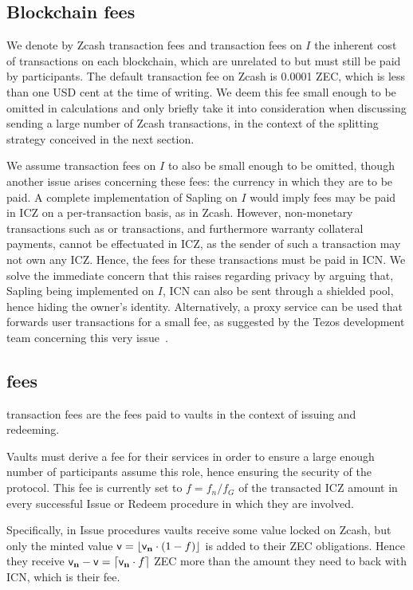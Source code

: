 \subsection{Blockchain fees}

We denote by Zcash transaction fees and transaction fees on $I$ the inherent cost of transactions on each blockchain, which are unrelated to \zclaim but must still be paid by participants.
The default transaction fee on Zcash is 0.0001 ZEC, which is less than one USD cent at the time of writing.
We deem this fee small enough to be omitted in calculations and only briefly take it into consideration when discussing sending a large number of Zcash transactions, in the context of the splitting strategy conceived in the next section.

We assume transaction fees on $I$ to also be small enough to be omitted, though another issue arises concerning these fees: the currency in which they are to be paid.
A complete implementation of Sapling on $I$ would imply fees may be paid in ICZ on a per-transaction basis, as in Zcash.
However, non-monetary \zclaim transactions such as \requestLock or \confirmIssue transactions, and furthermore warranty collateral payments, cannot be effectuated in ICZ, as the sender of such a transaction may not own any ICZ.
Hence, the fees for these transactions must be paid in ICN.
We solve the immediate concern that this raises regarding privacy by arguing that, Sapling being implemented on $I$, ICN can also be sent through a shielded pool, hence hiding the owner's identity.
Alternatively, a proxy service can be used that forwards user transactions for a small fee, as suggested by the Tezos development team concerning this very issue~\cite{saplingTezos}.

\subsection{\zclaim fees}

\zclaim transaction fees are the fees paid to vaults in the context of issuing and redeeming.

Vaults must derive a fee for their services in order to ensure a large enough number of participants assume this role, hence ensuring the security of the protocol.
This fee is currently set to $f = f_n/f_G$ of the transacted ICZ amount in every successful Issue or Redeem procedure in which they are involved.

Specifically, in Issue procedures vaults receive some value \valn locked on Zcash, but only the minted value $\val = \left \lfloor{\valn \cdot (1 - f)}\right \rfloor$ is added to their ZEC obligations.
Hence they receive $\valn - \val = \left \lceil{\valn \cdot f}\right \rceil$ ZEC more than the amount they need to back with ICN, which is their fee.

